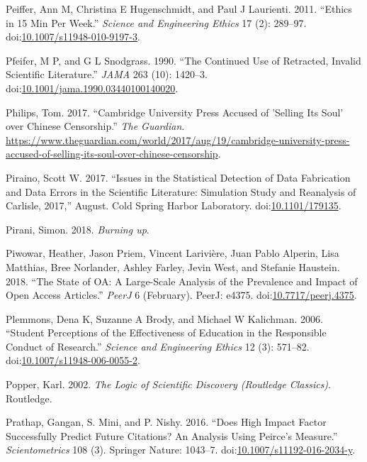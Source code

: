 \documentclass[a5paper]{book}
\begin{document}
\hypertarget{ref-doi:10.1007ux2fs11948-010-9197-3}{}
Peiffer, Ann M, Christina E Hugenschmidt, and Paul J Laurienti. 2011.
``Ethics in 15 Min Per Week.'' \emph{Science and Engineering Ethics} 17
(2): 289--97.
doi:\href{https://doi.org/10.1007/s11948-010-9197-3}{10.1007/s11948-010-9197-3}.

\hypertarget{ref-doi:10.1001ux2fjama.1990.03440100140020}{}
Pfeifer, M P, and G L Snodgrass. 1990. ``The Continued Use of Retracted,
Invalid Scientific Literature.'' \emph{JAMA} 263 (10): 1420--3.
doi:\href{https://doi.org/10.1001/jama.1990.03440100140020}{10.1001/jama.1990.03440100140020}.

\hypertarget{ref-guardian-cup}{}
Philips, Tom. 2017. ``Cambridge University Press Accused of 'Selling Its
Soul' over Chinese Censorship.'' \emph{The Guardian}.
\url{https://www.theguardian.com/world/2017/aug/19/cambridge-university-press-accused-of-selling-its-soul-over-chinese-censorship}.

\hypertarget{ref-doi:10.1101ux2f179135}{}
Piraino, Scott W. 2017. ``Issues in the Statistical Detection of Data
Fabrication and Data Errors in the Scientific Literature: Simulation
Study and Reanalysis of Carlisle, 2017,'' August. Cold Spring Harbor
Laboratory. doi:\href{https://doi.org/10.1101/179135}{10.1101/179135}.

\hypertarget{ref-isbn:9780745335612}{}
Pirani, Simon. 2018. \emph{Burning up}.

\hypertarget{ref-doi:10.7717ux2fpeerj.4375}{}
Piwowar, Heather, Jason Priem, Vincent Larivière, Juan Pablo Alperin,
Lisa Matthias, Bree Norlander, Ashley Farley, Jevin West, and Stefanie
Haustein. 2018. ``The State of OA: A Large-Scale Analysis of the
Prevalence and Impact of Open Access Articles.'' \emph{PeerJ} 6
(February). PeerJ: e4375.
doi:\href{https://doi.org/10.7717/peerj.4375}{10.7717/peerj.4375}.

\hypertarget{ref-doi:10.1007ux2fs11948-006-0055-2}{}
Plemmons, Dena K, Suzanne A Brody, and Michael W Kalichman. 2006.
``Student Perceptions of the Effectiveness of Education in the
Responsible Conduct of Research.'' \emph{Science and Engineering Ethics}
12 (3): 571--82.
doi:\href{https://doi.org/10.1007/s11948-006-0055-2}{10.1007/s11948-006-0055-2}.

\hypertarget{ref-isbn:9780415278430}{}
Popper, Karl. 2002. \emph{The Logic of Scientific Discovery (Routledge
Classics)}. Routledge.

\hypertarget{ref-doi:10.1007ux2fs11192-016-2034-y}{}
Prathap, Gangan, S. Mini, and P. Nishy. 2016. ``Does High Impact Factor
Successfully Predict Future Citations? An Analysis Using Peirce's
Measure.'' \emph{Scientometrics} 108 (3). Springer Nature: 1043--7.
doi:\href{https://doi.org/10.1007/s11192-016-2034-y}{10.1007/s11192-016-2034-y}.
\end{document}

